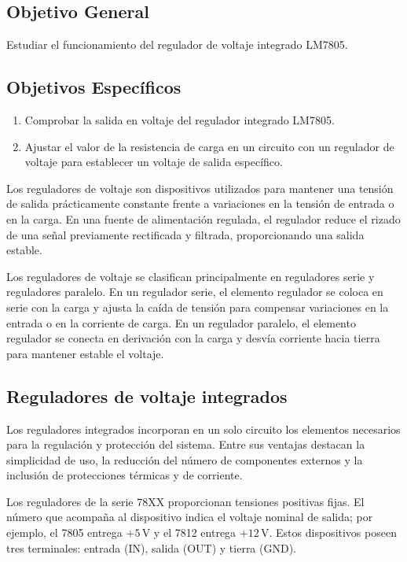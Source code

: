 \documentclass[12pt,a4paper]{article}
\begin{document}
\makeInformePortada
\setcounter{page}{1}
\tableofcontents
\newpage

\subsection{Objetivo General}
Estudiar el funcionamiento del regulador de voltaje integrado LM7805.

\subsection{Objetivos Específicos}
\begin{enumerate}
\item Comprobar la salida en voltaje del regulador integrado LM7805.
\item Ajustar el valor de la resistencia de carga en un circuito con un regulador de voltaje para establecer un voltaje de salida específico.
\end{enumerate}


Los reguladores de voltaje son dispositivos utilizados para mantener una tensión de salida prácticamente constante frente a variaciones en la tensión de entrada o en la carga. En una fuente de alimentación regulada, el regulador reduce el rizado de una señal previamente rectificada y filtrada, proporcionando una salida estable.

Los reguladores de voltaje se clasifican principalmente en reguladores serie y reguladores paralelo. En un regulador serie, el elemento regulador se coloca en serie con la carga y ajusta la caída de tensión para compensar variaciones en la entrada o en la corriente de carga. En un regulador paralelo, el elemento regulador se conecta en derivación con la carga y desvía corriente hacia tierra para mantener estable el voltaje.

\subsection{Reguladores de voltaje integrados}

Los reguladores integrados incorporan en un solo circuito los elementos necesarios para la regulación y protección del sistema. Entre sus ventajas destacan la simplicidad de uso, la reducción del número de componentes externos y la inclusión de protecciones térmicas y de corriente.

Los reguladores de la serie 78XX proporcionan tensiones positivas fijas. El número que acompaña al dispositivo indica el voltaje nominal de salida; por ejemplo, el 7805 entrega $+5\,\text{V}$ y el 7812 entrega $+12\,\text{V}$. Estos dispositivos poseen tres terminales: entrada (IN), salida (OUT) y tierra (GND).
\end{document}
